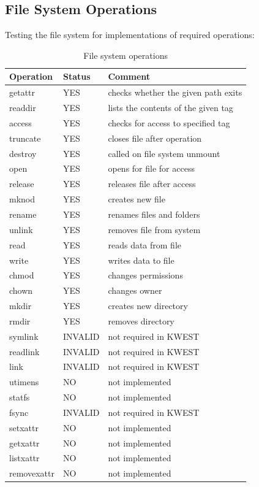 \subsection{File System Operations}
Testing the file system for implementations of required operations:
\begin{table}[h]
\begin{tabular}{|p{2cm}|p{2cm}|p{8cm}|}
\hline
\textbf{Operation} & \textbf{Status} & \textbf{Comment} \\ \hline
getattr & YES & checks whether the given path exits \\
readdir	 & YES & lists the contents of the given tag \\
access	& YES & checks for access to specified tag \\
truncate	 & YES & closes file after operation \\
destroy	 & YES & called on file system unmount \\
open		& YES & opens for file for access \\
release	& YES & releases file after access \\
mknod		& YES & creates new file \\
rename		& YES & renames files and folders \\
unlink		& YES & removes file from system \\
read		& YES & reads data from file \\
write		& YES & writes data to file \\
chmod		& YES & changes permissions \\
chown		& YES & changes owner\\
mkdir		& YES & creates new directory \\
rmdir		& YES & removes directory\\

symlink	 & INVALID & not required in KWEST \\ 
readlink & INVALID & not required in KWEST \\
link		& INVALID & not required in KWEST \\
utimens	& NO & not implemented \\
statfs	& NO & not implemented \\
fsync & INVALID & not required in KWEST \\

setxattr	& NO & not implemented \\
getxattr	& NO & not implemented \\
listxattr	& NO & not implemented \\
removexattr	& NO & not implemented \\
\hline
\end{tabular}
\caption{File system operations}
\label{fsop}
\end{table}


